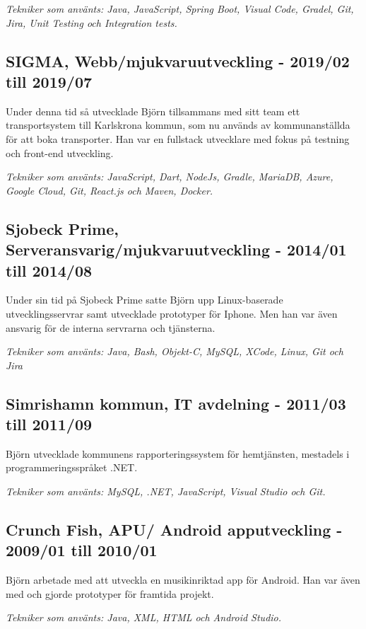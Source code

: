 \documentclass{article}
\begin{document}
\begin{minipage}[t]{0.7\textwidth}
  \vspace{5pt}\textit{Tekniker som använts: Java, JavaScript, Spring Boot, Visual Code, Gradel, Git, Jira, Unit Testing och Integration tests.} 
  
  \vspace{15pt} %
  \subsection*{\textcolor{colorTitelErfarenhet}{SIGMA, Webb/mjukvaruutveckling - 2019/02 till 2019/07}}
  Under denna tid så utvecklade Björn tillsammans med sitt team ett transportsystem 
  till Karlskrona kommun, som nu används av kommunanställda för att boka transporter. 
  Han var en fullstack utvecklare med fokus på testning och front-end utveckling.
  
  \vspace{5pt}\textit{Tekniker som använts: JavaScript, Dart, NodeJs, Gradle, MariaDB, Azure, Google Cloud, Git, React.js och Maven, Docker.} 
  

  \vspace{15pt} %
  \subsection*{\textcolor{colorTitelErfarenhet}{Sjobeck Prime, Serveransvarig/mjukvaruutveckling - 2014/01 till 2014/08}}
  Under sin tid på Sjobeck Prime satte Björn upp Linux-baserade utvecklingsservrar samt utvecklade 
  prototyper för Iphone. Men han var även ansvarig för de interna servrarna och tjänsterna.
  
  \vspace{5pt}\textit{Tekniker som använts: Java, Bash, Objekt-C, MySQL, XCode, Linux, Git och Jira} 
    

  \vspace{15pt} %
  \subsection*{\textcolor{colorTitelErfarenhet}{Simrishamn kommun, IT avdelning - 2011/03 till 2011/09}}
  Björn utvecklade kommunens rapporteringssystem för hemtjänsten, mestadels i programmeringsspråket .NET.
  
  \vspace{5pt}\textit{Tekniker som använts: MySQL, .NET, JavaScript, Visual Studio och Git.}
    

  \vspace{15pt} %
  \subsection*{\textcolor{colorTitelErfarenhet}{Crunch Fish, APU/ Android apputveckling - 2009/01 till 2010/01}}
  Björn arbetade med att utveckla en musikinriktad app för Android. Han var även med och gjorde prototyper för framtida projekt.
  
  \vspace{5pt}\textit{Tekniker som använts: Java, XML, HTML och Android Studio.}

\end{minipage}%
\end{document}
